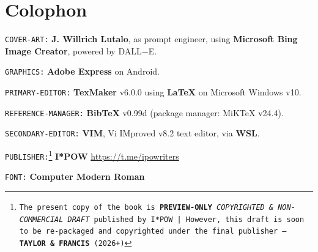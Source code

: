 \documentclass[a4paper, 18pt]{book} %
\begin{document}
\printindex


\chapter*{Colophon}


\texttt{COVER-ART:} \textbf{J. Willrich Lutalo}, as prompt engineer, using \textbf{Microsoft Bing Image Creator}, powered by DALL$-$E.


\texttt{GRAPHICS:} \textbf{Adobe Express} on Android.


\texttt{PRIMARY-EDITOR:} \textbf{TexMaker} v6.0.0 using \textbf{LaTeX} on Microsoft Windows v10.


\texttt{REFERENCE-MANAGER:} \textbf{BibTeX} v0.99d (package manager: MiKTeX v24.4).


\texttt{SECONDARY-EDITOR:} \textbf{VIM}, Vi IMproved v8.2 text editor, via \textbf{WSL}.


\texttt{PUBLISHER:\footnote{The present copy of the book is \textbf{PREVIEW-ONLY} \textit{COPYRIGHTED \& NON-COMMERCIAL DRAFT} published by I*POW | However, this draft is soon to be re-packaged and copyrighted under the final publisher --- \textbf{TAYLOR \& FRANCIS} (2026+)}} \textbf{I*POW} \url{https://t.me/ipowriters}


\texttt{FONT:} \textbf{Computer Modern Roman}




\end{document}
